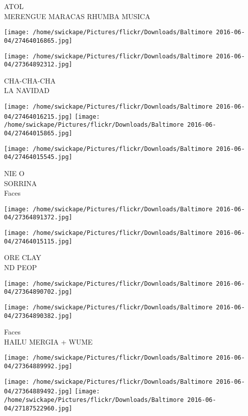 \documentclass[10pt,letterpaper]{article}
\begin{document}
ATOL\\
MERENGUE MARACAS RHUMBA MUSICA
\pagebreak

\texttt{[image: /home/swickape/Pictures/flickr/Downloads/Baltimore 2016-06-04/27464016865.jpg]}

\vspace{0.25in}
\texttt{[image: /home/swickape/Pictures/flickr/Downloads/Baltimore 2016-06-04/27364892312.jpg]}

CHA{-}CHA{-}CHA\\
LA NAVIDAD
\pagebreak

\texttt{[image: /home/swickape/Pictures/flickr/Downloads/Baltimore 2016-06-04/27464016215.jpg]}
\texttt{[image: /home/swickape/Pictures/flickr/Downloads/Baltimore 2016-06-04/27464015865.jpg]}

\vspace{0.25in}
\texttt{[image: /home/swickape/Pictures/flickr/Downloads/Baltimore 2016-06-04/27464015545.jpg]}

NIE O\\
SORRINA\\
Faces
\pagebreak

\texttt{[image: /home/swickape/Pictures/flickr/Downloads/Baltimore 2016-06-04/27364891372.jpg]}

\vspace{0.25in}
\texttt{[image: /home/swickape/Pictures/flickr/Downloads/Baltimore 2016-06-04/27464015115.jpg]}

ORE CLAY\\
ND PEOP
\pagebreak

\texttt{[image: /home/swickape/Pictures/flickr/Downloads/Baltimore 2016-06-04/27364890702.jpg]}

\vspace{0.25in}
\texttt{[image: /home/swickape/Pictures/flickr/Downloads/Baltimore 2016-06-04/27364890382.jpg]}

Faces\\
HAILU MERGIA + WUME
\pagebreak

\texttt{[image: /home/swickape/Pictures/flickr/Downloads/Baltimore 2016-06-04/27364889992.jpg]}

\vspace{0.25in}
\texttt{[image: /home/swickape/Pictures/flickr/Downloads/Baltimore 2016-06-04/27364889492.jpg]}
\texttt{[image: /home/swickape/Pictures/flickr/Downloads/Baltimore 2016-06-04/27187522960.jpg]}
\end{document}
